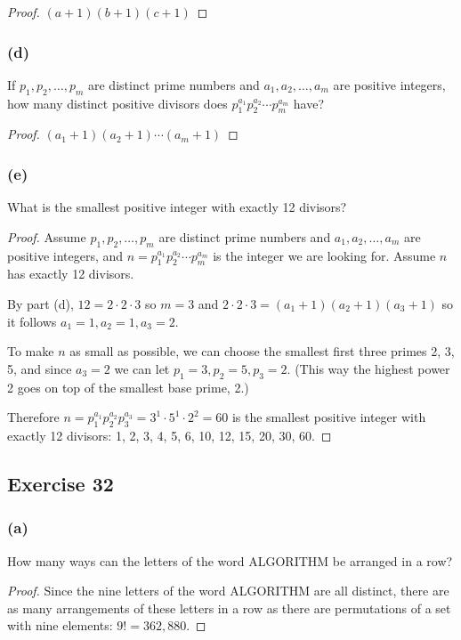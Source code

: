 \documentclass[14pt]{extarticle}
\begin{document}
\begin{proof}
\((a+1)(b+1)(c+1)\)
\end{proof}

\subsubsection{(d)}
If \(p_1, p_2, \ldots, p_m\) are distinct prime numbers and \(a_1, a_2, \ldots, a_m\) are positive integers, how many 
distinct positive divisors does \(p_1^{a_1} p_2^{a_2} \cdots p_m^{a_m}\) have?

\begin{proof}
\((a_1+1)(a_2+1) \cdots (a_m+1)\)
\end{proof}

\subsubsection{(e)}
What is the smallest positive integer with exactly 12 divisors?

\begin{proof}
Assume \(p_1, p_2, \ldots, p_m\) are distinct prime numbers and \(a_1, a_2, \ldots, a_m\) are positive integers, and 
\(n = p_1^{a_1} p_2^{a_2} \cdots p_m^{a_m}\) is the integer we are looking for. Assume $n$ has exactly 12 divisors.

By part (d), \(12 = 2 \cdot 2 \cdot 3\) so $m=3$ and \(2 \cdot 2 \cdot 3 = (a_1+1)(a_2+1)(a_3+1)\) so it follows 
\(a_1 = 1, a_2 = 1, a_3 = 2\). 

To make $n$ as small as possible, we can choose the smallest first three primes 2, 3, 5, and since \(a_3 = 2\) 
we can let \(p_1 = 3, p_2 = 5, p_3 = 2\). (This way the highest power 2 goes on top of the smallest base prime, 2.)

Therefore \(n = p_1^{a_1} p_2^{a_2} p_3^{a_3} = 3^1 \cdot 5^1 \cdot 2^2 = 60\) is the smallest positive integer with 
exactly 12 divisors: 1, 2, 3, 4, 5, 6, 10, 12, 15, 20, 30, 60.
\end{proof}

\subsection{Exercise 32}
\subsubsection{(a)}
How many ways can the letters of the word ALGORITHM be arranged in a row?

\begin{proof}
Since the nine letters of the word ALGORITHM are all distinct, there are as many arrangements of these letters 
in a row as there are permutations of a set with nine elements: \(9! = 362,880\).
\end{proof}
\end{document}
